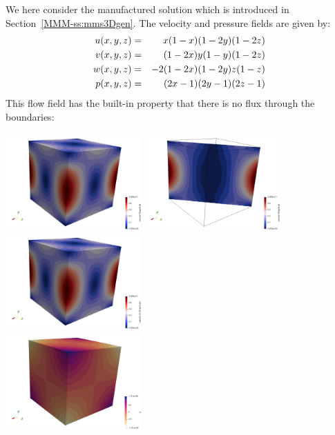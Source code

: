 We here consider the manufactured solution which is introduced 
in Section~\ref{MMM-ss:mms3Dgen}. The velocity and pressure fields are
given by:
\begin{eqnarray}
u(x,y,z) &=& x(1-x)(1-2y)(1-2z) \nonumber\\
v(x,y,z) &=& (1-2x) y(1-y) (1-2z) \nonumber\\
w(x,y,z) &=& -2(1-2x)(1-2y)z(1-z) \nonumber\\
p(x,y,z) &=& (2x-1)(2y-1)(2z-1) \nonumber
\end{eqnarray}
This flow field has the built-in property that there is no flux through the 
boundaries:

\begin{center}
\includegraphics[width=5.2cm]{python_codes/fieldstone_82/RESULTS/bench5/vel1}
\includegraphics[width=5.2cm]{python_codes/fieldstone_82/RESULTS/bench5/vel2}
\includegraphics[width=5.2cm]{python_codes/fieldstone_82/RESULTS/bench5/velth}\\
\includegraphics[width=5.2cm]{python_codes/fieldstone_82/RESULTS/bench5/press1}

\end{center}
